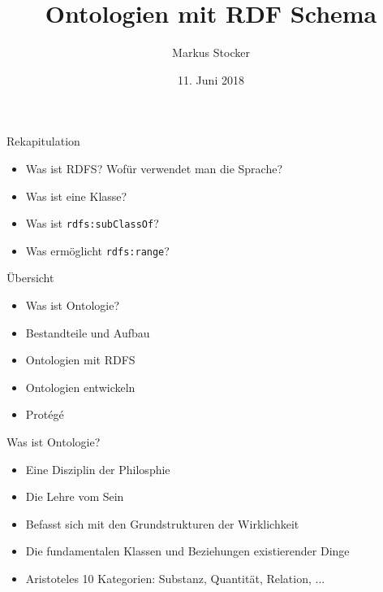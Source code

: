 \documentclass{beamer}
\title{Ontologien mit RDF Schema}
\author{Markus Stocker}
\date{11. Juni 2018}
\begin{document}
\maketitle

\begin{frame}{Rekapitulation}
	
	\begin{itemize}
		\item Was ist RDFS? Wofür verwendet man die Sprache?
		\item Was ist eine Klasse?
		\item Was ist \texttt{rdfs:subClassOf}?
		\item Was ermöglicht \texttt{rdfs:range}?
	\end{itemize}
	
\end{frame}

\begin{frame}{Übersicht}
	
	\begin{itemize}
		\item Was ist Ontologie?
		\item Bestandteile und Aufbau
		\item Ontologien mit RDFS
		\item Ontologien entwickeln
		\item Prot{\'e}g{\'e}
	\end{itemize}
	
\end{frame}

\begin{frame}{Was ist Ontologie?}
	
	\begin{itemize}
		\item Eine Disziplin der Philosphie
		\item Die Lehre vom Sein
		\item Befasst sich mit den Grundstrukturen der Wirklichkeit
		\item Die fundamentalen Klassen und Beziehungen existierender Dinge 
		\item Aristoteles 10 Kategorien: Substanz, Quantität, Relation, ...
	\end{itemize}
	
\end{frame}
\end{document}
